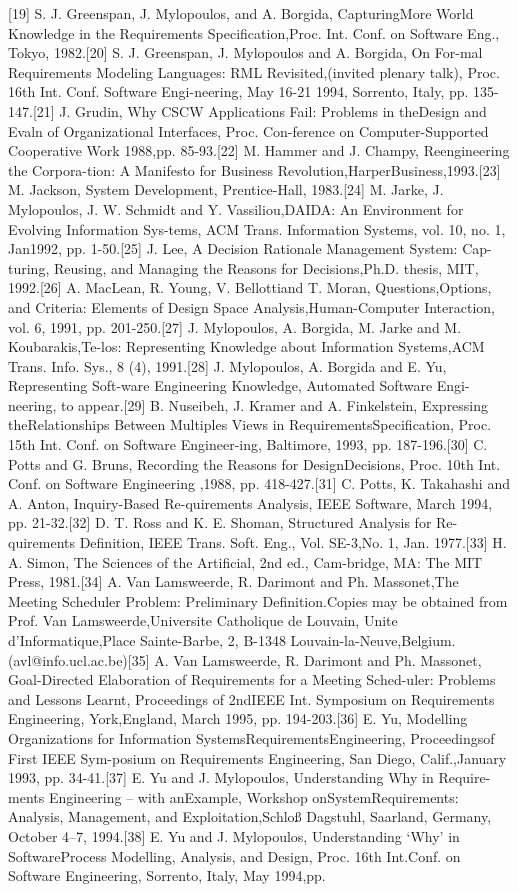 [19] S. J. Greenspan, J. Mylopoulos, and A. Borgida, CapturingMore World Knowledge in the Requirements Speciﬁcation,Proc. Int. Conf. on Software Eng., Tokyo, 1982.[20] S. J. Greenspan, J. Mylopoulos and A. Borgida, On For-mal Requirements Modeling Languages: RML Revisited,(invited plenary talk), Proc. 16th Int. Conf. Software Engi-neering, May 16-21 1994, Sorrento, Italy, pp. 135-147.[21] J. Grudin, Why CSCW Applications Fail: Problems in theDesign and Evaln of Organizational Interfaces, Proc. Con-ference on Computer-Supported Cooperative Work 1988,pp. 85-93.[22] M. Hammer and J. Champy, Reengineering the Corpora-tion: A Manifesto for Business Revolution,HarperBusiness,1993.[23] M. Jackson, System Development, Prentice-Hall, 1983.[24] M. Jarke, J. Mylopoulos, J. W. Schmidt and Y. Vassiliou,DAIDA: An Environment for Evolving Information Sys-tems, ACM Trans. Information Systems, vol. 10, no. 1, Jan1992, pp. 1-50.[25] J. Lee, A Decision Rationale Management System: Cap-turing, Reusing, and Managing the Reasons for Decisions,Ph.D. thesis, MIT, 1992.[26] A. MacLean, R. Young, V. Bellottiand T. Moran, Questions,Options, and Criteria: Elements of Design Space Analysis,Human-Computer Interaction, vol. 6, 1991, pp. 201-250.[27] J. Mylopoulos, A. Borgida, M. Jarke and M. Koubarakis,Te-los: Representing Knowledge about Information Systems,ACM Trans. Info. Sys., 8 (4), 1991.[28] J. Mylopoulos, A. Borgida and E. Yu, Representing Soft-ware Engineering Knowledge, Automated Software Engi-neering, to appear.[29] B. Nuseibeh, J. Kramer and A. Finkelstein, Expressing theRelationships Between Multiples Views in RequirementsSpeciﬁcation, Proc. 15th Int. Conf. on Software Engineer-ing, Baltimore, 1993, pp. 187-196.[30] C. Potts and G. Bruns, Recording the Reasons for DesignDecisions, Proc. 10th Int. Conf. on Software Engineering ,1988, pp. 418-427.[31] C. Potts, K. Takahashi and A. Anton, Inquiry-Based Re-quirements Analysis, IEEE Software, March 1994, pp. 21-32.[32] D. T. Ross and K. E. Shoman, Structured Analysis for Re-quirements Deﬁnition, IEEE Trans. Soft. Eng., Vol. SE-3,No. 1, Jan. 1977.[33] H. A. Simon, The Sciences of the Artiﬁcial, 2nd ed., Cam-bridge, MA: The MIT Press, 1981.[34] A. Van Lamsweerde, R. Darimont and Ph. Massonet,The Meeting Scheduler Problem: Preliminary Deﬁnition.Copies may be obtained from Prof. Van Lamsweerde,Universite Catholique de Louvain, Unite d’Informatique,Place Sainte-Barbe, 2, B-1348 Louvain-la-Neuve,Belgium.(avl@info.ucl.ac.be)[35] A. Van Lamsweerde, R. Darimont and Ph. Massonet, Goal-Directed Elaboration of Requirements for a Meeting Sched-uler: Problems and Lessons Learnt, Proceedings of 2ndIEEE Int. Symposium on Requirements Engineering, York,England, March 1995, pp. 194-203.[36] E. Yu, Modelling Organizations for Information SystemsRequirementsEngineering, Proceedingsof First IEEE Sym-posium on Requirements Engineering, San Diego, Calif.,January 1993, pp. 34-41.[37] E. Yu and J. Mylopoulos, Understanding Why in Require-ments Engineering – with anExample, Workshop onSystemRequirements: Analysis, Management, and Exploitation,Schloß Dagstuhl, Saarland, Germany, October 4–7, 1994.[38] E. Yu and J. Mylopoulos, Understanding ‘Why’ in SoftwareProcess Modelling, Analysis, and Design, Proc. 16th Int.Conf. on Software Engineering, Sorrento, Italy, May 1994,pp. 